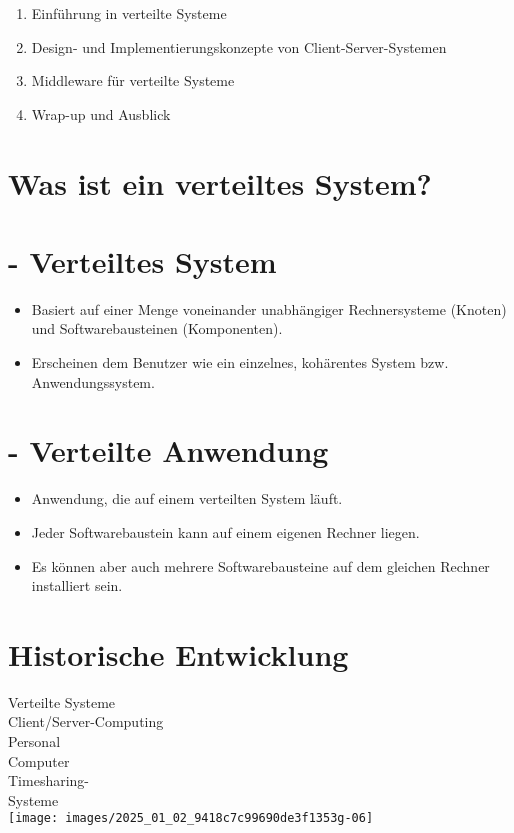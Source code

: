 \documentclass[10pt]{article}
\begin{document}
\begin{enumerate}
  \item Einführung in verteilte Systeme
  \item Design- und Implementierungskonzepte von Client-Server-Systemen
  \item Middleware für verteilte Systeme
  \item Wrap-up und Ausblick
\end{enumerate}

\section*{Was ist ein verteiltes System?}
\section*{- Verteiltes System}
\begin{itemize}
  \item Basiert auf einer Menge voneinander unabhängiger Rechnersysteme (Knoten) und Softwarebausteinen (Komponenten).
  \item Erscheinen dem Benutzer wie ein einzelnes, kohärentes System bzw. Anwendungssystem.
\end{itemize}

\section*{- Verteilte Anwendung}
\begin{itemize}
  \item Anwendung, die auf einem verteilten System läuft.
  \item Jeder Softwarebaustein kann auf einem eigenen Rechner liegen.
  \item Es können aber auch mehrere Softwarebausteine auf dem gleichen Rechner installiert sein.
\end{itemize}

\section*{Historische Entwicklung}
Verteilte Systeme\\
Client/Server-Computing\\
Personal\\
Computer\\
Timesharing-\\
Systeme\\
\texttt{[image: images/2025\_01\_02\_9418c7c99690de3f1353g-06]}
\end{document}

